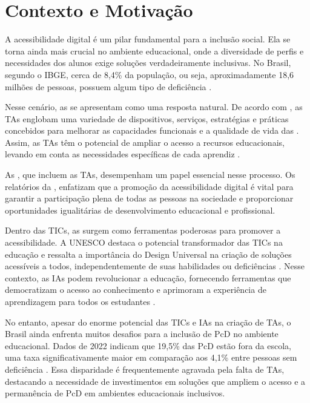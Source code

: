 \section{Contexto e Motivação}


A acessibilidade digital é um pilar fundamental para a inclusão social. Ela se torna ainda mais crucial no ambiente educacional, onde a diversidade de perfis e necessidades dos alunos exige soluções verdadeiramente inclusivas. No Brasil, segundo o IBGE, cerca de 8,4\% da população, ou seja, aproximadamente 18,6 milhões de pessoas, possuem algum tipo de deficiência \cite{IBGE2022}.

Nesse cenário, as  se apresentam como uma resposta natural. De acordo com , as TAs englobam uma variedade de dispositivos, serviços, estratégias e práticas concebidos para melhorar as capacidades funcionais e a qualidade de vida das . Assim, as TAs têm o potencial de ampliar o acesso a recursos educacionais, levando em conta as necessidades específicas de cada aprendiz \cite{UNESCO2023, GovBr2023}. 

As , que incluem as TAs, desempenham um papel essencial nesse processo. Os relatórios da , enfatizam que a promoção da acessibilidade digital é vital para garantir a participação plena de todas as pessoas na sociedade e proporcionar oportunidades igualitárias de desenvolvimento educacional e profissional.


Dentro das TICs, as  surgem como ferramentas poderosas para promover a acessibilidade. A UNESCO destaca o potencial transformador das TICs na educação e ressalta a importância do Design Universal na criação de soluções acessíveis a todos, independentemente de suas habilidades ou deficiências \cite{UNESCO2023, GovBr2023}. Nesse contexto, as IAs podem revolucionar a educação, fornecendo ferramentas que democratizam o acesso ao conhecimento e aprimoram a experiência de aprendizagem para todos os estudantes \cite{Holmes2019,UNESCO2024}.

No entanto, apesar do enorme potencial das TICs e IAs na criação de TAs, o Brasil ainda enfrenta muitos desafios para a inclusão de PcD no ambiente educacional. Dados de 2022 indicam que 19,5\% das PcD estão fora da escola, uma taxa significativamente maior em comparação aos 4,1\% entre pessoas sem deficiência \cite{IBGE2022}. Essa disparidade é frequentemente agravada pela falta de TAs, destacando a necessidade de investimentos em soluções que ampliem o acesso e a permanência de PcD em ambientes educacionais inclusivos.

